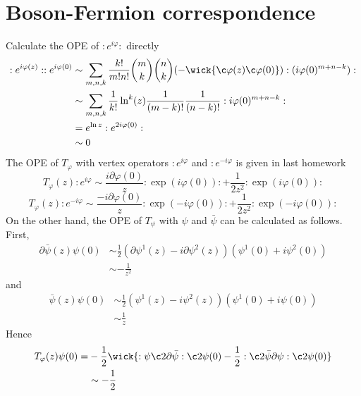 \section{Boson-Fermion correspondence}
Calculate the OPE of $:e^{i \varphi}:$ directly
\[
\begin{aligned}
:e^{i\varphi(z)}::e^{i\varphi(0)} &\sim\sum_{m,n,k} \frac{k!}{m!n!}\binom{m}{k}\binom{n}{k} (-\wick{\c\varphi(z)\c\varphi(0)}):(i\varphi(0)^{m+n-k}):\\
& \sim \sum_{m,n,k} \frac{1}{k!}\ln^k(z) \frac{1}{(m-k)!}\frac{1}{(n-k)!}:i\varphi(0)^{m+n-k}:\\
&= e^{\ln z} : e^{2i\varphi(0)}:\\
&\sim 0
\end{aligned}
\]
The OPE of $T_\varphi$ with vertex operators $:e^{i\varphi}$ and $:e^{-i\varphi}$ is given in last homework
\[
T_\varphi (z) :e^{i \varphi} \sim \frac{i \partial \varphi(0)}{z}:\exp(i\varphi(0)): +\frac{1}{2z^2} :\exp(i\varphi(0)):
\]
\[
T_\varphi (z) :e^{-i \varphi} \sim \frac{-i \partial \varphi(0)}{z}:\exp(-i\varphi(0)): +\frac{1}{2z^2} :\exp(-i\varphi(0)):
\]
On the other hand, the OPE of $T_\psi$ with $\psi$ and $\bar\psi$ can be calculated as follows.
First,
\[
\begin{aligned}
\partial\bar{\psi}(z) \psi(0) &\sim \frac{1}{2}(\partial\psi^1(z) - i \partial\psi^2(z))(\psi^1(0)+ i \psi^2(0))\\
& \sim - \frac{1}{z^2}
\end{aligned}
\]
and
\[
\begin{aligned}
 \bar{\psi}(z)\psi(0) & \sim \frac{1}{2} (\psi^1(z) - i\psi^2(z) )(\psi^1(0)+ i\psi(0))\\
 & \sim \frac{1}{z}
\end{aligned}
\]
Hence
\[
\begin{aligned}
T_\varphi(z) \psi(0) =& - \frac{1}{2}\wick{:\psi  \c2\partial\bar{\psi}:\c2\psi(0) - \frac{1}{2}: \c2{\bar{\psi}} \partial \psi: \c2 \psi(0)}\\
&\sim - \frac{1}{2}
\end{aligned}
\]